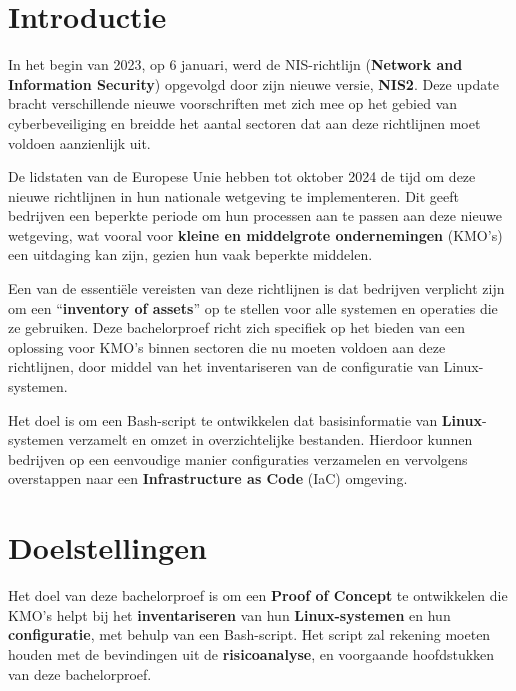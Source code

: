 \documentclass[a0,portrait]{hogent-poster}
\begin{document}
\begin{multicols}{2} %

\section{Introductie}

In het begin van 2023, op 6 januari, werd de NIS-richtlijn (\textbf{Network and Information Security}) opgevolgd door zijn nieuwe versie, \textbf{NIS2}.
Deze update bracht verschillende nieuwe voorschriften met zich mee op het gebied van cyberbeveiliging en breidde het aantal sectoren dat aan deze richtlijnen moet voldoen aanzienlijk uit.

De lidstaten van de Europese Unie hebben tot oktober 2024 de tijd om deze nieuwe richtlijnen in hun nationale wetgeving te implementeren.
Dit geeft bedrijven een beperkte periode om hun processen aan te passen aan deze nieuwe wetgeving, wat vooral voor \textbf{kleine en middelgrote ondernemingen} (KMO's) een uitdaging kan zijn, gezien hun vaak beperkte middelen.

Een van de essenti\"ele vereisten van deze richtlijnen is dat bedrijven verplicht zijn om een ``\textbf{inventory of assets}'' op te stellen voor alle systemen en operaties die ze gebruiken.
Deze bachelorproef richt zich specifiek op het bieden van een oplossing voor KMO's binnen sectoren die nu moeten voldoen aan deze richtlijnen, door middel van het inventariseren van de configuratie van Linux-systemen.

Het doel is om een Bash-script te ontwikkelen dat basisinformatie van \textbf{Linux}-systemen verzamelt en omzet in overzichtelijke bestanden.
Hierdoor kunnen bedrijven op een eenvoudige manier configuraties verzamelen en vervolgens overstappen naar een \textbf{Infrastructure as Code} (IaC) omgeving.

\section{Doelstellingen}

Het doel van deze bachelorproef is om een \textbf{Proof of Concept} te ontwikkelen die KMO's helpt bij het \textbf{inventariseren} van hun \textbf{Linux-systemen} en hun \textbf{configuratie}, met behulp van een Bash-script.
Het script zal rekening moeten houden met de bevindingen uit de \textbf{risicoanalyse}, en voorgaande hoofdstukken van deze bachelorproef.


\end{multicols}
\end{document}
